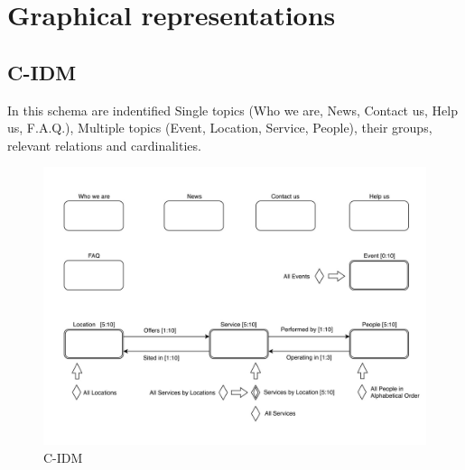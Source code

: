 %
%
\chapter{Graphical representations}
%
%
%
\section{C-IDM}
In this schema are indentified Single topics (Who we are, News, Contact us, Help us, F.A.Q.), Multiple topics (Event, Location, Service, People), their groups, relevant relations and cardinalities.
%
\begin{figure}[h]
\includegraphics[width=1.03\textwidth, center]{MainMatter/images/C-IDM.jpg}
\caption{C-IDM}
\label{fig:figure1}
\end{figure}
\FloatBarrier
%
